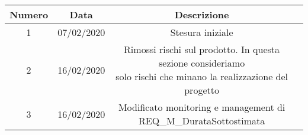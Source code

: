 \newpage
{} \\ \\
\begin{tabular}{|c | c | c | c|} 
 	\hline
	 Numero & Data & Descrizione \\ [0.5ex] 
	\hline\hline
	1 & 07/02/2020 & Stesura iniziale \\ 
	\hline
	2 & 16/02/2020 & \thead{Rimossi rischi sul prodotto. In questa sezione consideriamo\\solo rischi che minano la realizzazione del progetto} \\
	\hline
	3 & 16/02/2020 & Modificato monitoring e management di REQ\_M\_DurataSottostimata \\
	\hline
\end{tabular}